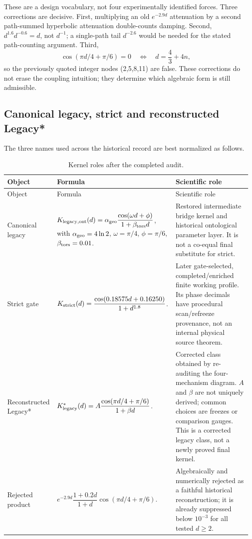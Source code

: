\documentclass[11pt,a4paper]{article}
\theoremstyle{definition}
\theoremstyle{remark}
\begin{document}
These are a design vocabulary, not four experimentally identified forces. Three corrections are decisive. First, multiplying an old $e^{-2.9d}$ attenuation by a second path-summed hyperbolic attenuation double-counts damping. Second, $d^{1.6}d^{-0.6}=d$, not $d^{-1}$; a single-path tail $d^{-2.6}$ would be needed for the stated path-counting argument. Third,
\[
\cos(\pi d/4+\pi/6)=0\quad\Longleftrightarrow\quad d=\frac43+4n,
\]
so the previously quoted integer nodes (2,5,8,11) are false. These corrections do not erase the coupling intuition; they determine which algebraic form is still admissible.

\subsection{Canonical legacy, strict and reconstructed Legacy*}

The three names used across the historical record are best normalized as follows.

\begin{longtable}{@{}p{}p{}p{}@{}}
\caption{Kernel roles after the completed audit.}\\
\toprule
Object & Formula & Scientific role\\
\midrule
\endfirsthead
\toprule
Object & Formula & Scientific role\\
\midrule
\endhead
Canonical legacy &

$K_{\rm legacy,ont}(d)=\alpha_{\rm geo}\dfrac{\cos(\omega d+\phi)}{1+\beta_{\rm tors}d}$, with $\alpha_{\rm geo}=4\ln2$, $\omega=\pi/4$, $\phi=\pi/6$, $\beta_{\rm tors}=0.01$. & Restored intermediate bridge kernel and historical ontological parameter layer. It is not a co-equal final substitute for strict.\\[2mm]
Strict gate &

$K_{\rm strict}(d)=\dfrac{\cos(0.18575d+0.16250)}{1+d^{1.8}}$. & Later gate-selected, completed/enriched finite working profile. Its phase decimals have procedural scan/refreeze provenance, not an internal physical source theorem.\\[2mm]
Reconstructed Legacy* &

$K^*_{\rm legacy}(d)=A\dfrac{\cos(\pi d/4+\pi/6)}{1+\beta d}$. & Corrected class obtained by re-auditing the four-mechanism diagram. $A$ and $\beta$ are not uniquely derived; common choices are freezes or comparison gauges. This is a corrected legacy class, not a newly proved final kernel.\\
Rejected product &

$e^{-2.9d}\dfrac{1+0.2d}{1+d}\cos(\pi d/4+\pi/6)$. & Algebraically and numerically rejected as a faithful historical reconstruction; it is already suppressed below $10^{-3}$ for all tested $d\ge2$.\\
\bottomrule
\end{longtable}
\end{document}
